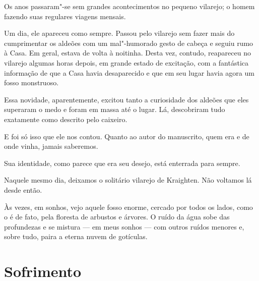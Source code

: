 Os anos passaram"-se sem grandes acontecimentos no pequeno vilarejo; o homem fazendo suas regulares viagens mensais.

Um dia, ele apareceu como sempre. Passou pelo vilarejo sem fazer mais do cumprimentar os aldeões com um mal"-humorado
gesto de cabeça e seguiu rumo à Casa. Em geral, estava de volta à noitinha. Desta vez, contudo, reapareceu no
vilarejo algumas horas depois, em grande estado de excitação, com a fantástica informação de que a Casa havia
desaparecido e que em seu lugar havia agora um fosso monstruoso.

Essa novidade, aparentemente, excitou tanto a curiosidade dos aldeões que eles superaram o medo e foram em massa até o
lugar. Lá, descobriram tudo exatamente como descrito pelo caixeiro.

E foi só isso que ele nos contou. Quanto ao autor do manuscrito, quem era e de onde vinha, jamais saberemos.

Sua identidade, como parece que era seu desejo, está enterrada para sempre.

Naquele mesmo dia, deixamos o solitário vilarejo de Kraighten. Não voltamos lá desde então.

Às vezes, em sonhos, vejo aquele fosso enorme, cercado por todos os lados, como o é de fato, pela floresta de arbustos e
árvores. O ruído da água sobe das profundezas e se mistura --- em meus sonhos --- com outros ruídos menores e, sobre
tudo, paira a eterna nuvem de gotículas.


\cleardoublepage

\chapter[Sofrimento]{Sofrimento}

